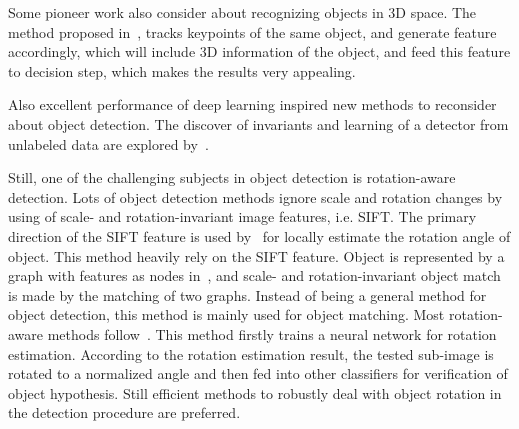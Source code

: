 Some pioneer work also consider about recognizing objects in 3D space. The method proposed in~\citep{r3d}, tracks keypoints of the same object, and generate feature accordingly, which will include 3D information of the object, and feed this feature to decision step, which makes the results very appealing.

Also excellent performance of deep learning inspired new methods to reconsider about object detection. The discover of invariants and learning of a detector from unlabeled data are explored by~\citep{dnnnn}.


Still, one of the challenging subjects in object detection is rotation-aware detection. Lots of object detection methods ignore scale and rotation changes by using of scale- and rotation-invariant image features, i.e. SIFT.
The primary  direction of the SIFT feature is used by~\citep{ac21} for locally estimate the rotation angle of object. This method heavily rely on the SIFT feature.
Object is represented by a graph with features as nodes in~\citep{ac222}, and scale- and rotation-invariant object match is made by the matching of two graphs. Instead of being a general method for object detection, this method is mainly used for object matching.
Most rotation-aware methods follow~\citep{ac20}. This method firstly trains a neural network for rotation estimation. According to the rotation estimation result, the tested sub-image is rotated to a normalized angle and then fed into other classifiers for verification of object hypothesis. Still efficient methods to robustly deal with object rotation in the detection procedure are preferred.




\begin{comment}
(a) a well-de?ned closed boundary
in space; (b) a different appearance from their surroundings [23, 25]; (c) sometimes it is unique within the image
and stands out as salient
\end{comment}


